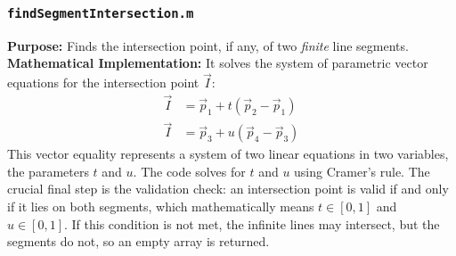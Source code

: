 \documentclass{article}
\begin{document}
	\subsubsection{\texttt{findSegmentIntersection.m}}
	\textbf{Purpose:} Finds the intersection point, if any, of two \textit{finite} line segments.
	\textbf{Mathematical Implementation:} It solves the system of parametric vector equations for the intersection point $\vec{I}$:
	\begin{align*}
		\vec{I} &= \vec{p}_1 + t(\vec{p}_2 - \vec{p}_1) \\
		\vec{I} &= \vec{p}_3 + u(\vec{p}_4 - \vec{p}_3)
	\end{align*}
	This vector equality represents a system of two linear equations in two variables, the parameters $t$ and $u$. The code solves for $t$ and $u$ using Cramer's rule. The crucial final step is the validation check: an intersection point is valid if and only if it lies on both segments, which mathematically means $t \in [0, 1]$ and $u \in [0, 1]$. If this condition is not met, the infinite lines may intersect, but the segments do not, so an empty array is returned.
\end{document}
